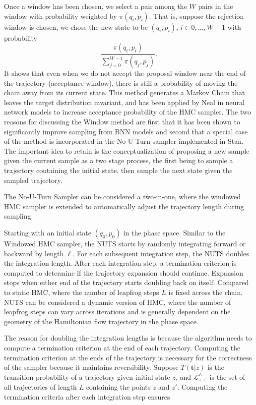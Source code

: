 \documentclass[12pt]{report}
\begin{document}
Once a window has been chosen, we select a pair among the $W$ pairs in the window with probability weighted by $\pi(q_i,p_i)$. That is, suppose the rejection window is chosen, we chose the new state to be $(q_i,p_i)$, $i \in {0,\dots,W-1}$ with probability 
\[ \frac{\pi(q_i,p_i)}{\sum_{j=0}^{W-1} \pi(q_j,p_j)}. \]
It shows that even when we do not accept the proposal window near the end of the trajectory (acceptance window), there is still a probability of moving the chain away from its current state. This method generates a Markov Chain that leaves the target distribution invariant, and has been applied by Neal in neural network models to increase acceptance probability of the HMC sampler\cite{neal1992improved}. The two reasons for discussing the Window method are first that it has been shown to
significantly improve sampling from BNN models and second that a special case of
the method is incorporated in the No U-Turn sampler implemented in Stan. The important idea to retain is the conceptualization of proposing a new sample given the current sample as a two stage process, the first being to sample a trajectory containing the initial state, then sample the next state given the sampled trajectory.


The No-U-Turn Sampler \cite{hoffman2014no} can be considered a two-in-one, where the windowed HMC sampler is extended to automatically adjust the trajectory length during sampling. 

Starting with an initial state $(q_0,p_0)$ in the phase space. Similar to the Windowed HMC sampler, the NUTS starts by randomly integrating forward or backward by length $\ell$. For each subsequent integration step, the NUTS doubles the integration length. After each integration step, a termination criterion is computed to determine if the trajectory expansion should continue. Expansion stops when either end of the trajectory starts doubling back on itself. Compared to static HMC, where the number of leapfrog steps $L$ is fixed across the chain, NUTS can be considered a dynamic version of HMC, where the number of leapfrog steps can vary across iterations and is generally dependent on the geometry of the Hamiltonian flow trajectory in the phase space. 

The reason for doubling the integration lengths is because the algorithm needs to compute a termination criterion at the end of each trajectory. Computing the termination criterion at the ends of the trajectory is necessary for the correctness of the sampler because it maintains reversibility. Suppose $T(\mathbf{t}|z) $ is the transition probability of a trajectory given initial state $z$, and $\mathcal{L}^L_{z,z'}$ is the set of all trajectories of length $L$ containing the points $z$ and $z'$. Computing the termination criteria after each integration step ensures
\end{document}
